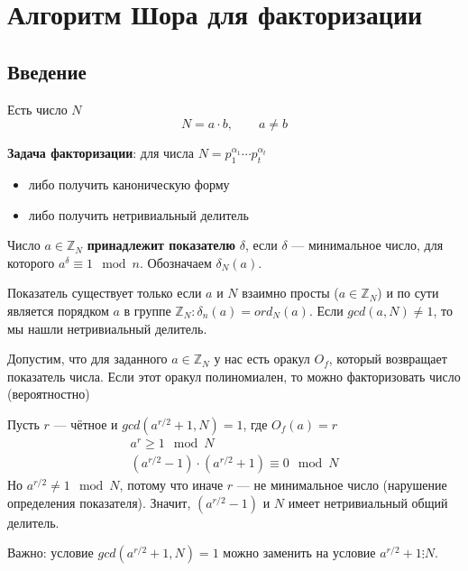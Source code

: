 \def\ZN{\mathbb{Z}_{N}}
\chapter{Алгоритм Шора для факторизации}
\section{Введение}

Есть число $N$
\begin{equation*}
  N = a \cdot b,\qquad a \neq b
\end{equation*}

\textbf{Задача факторизации}: для числа
$N = p_{1}^{\alpha_{1}} \cdots p_{t}^{\alpha_{t}}$
\begin{itemize}
  \item либо получить каноническую форму
  \item либо получить нетривиальный делитель
\end{itemize}

Число $a \in \mathbb{Z}_{N}$ \textbf{принадлежит показателю} $\delta$, если
$\delta$ --- минимальное число, для которого
$a^{\delta} \equiv 1 \mod n$.
Обозначаем $\delta_{N}\left( a \right)$.

Показатель существует только если $a$ и $N$ взаимно просты ($a \in \ZN$)
и по сути является порядком $a$ в группе
$\ZN: \delta_{n}\left( a \right) = ord_{N}\left( a \right)$.
Если $gcd\left( a, N \right) \neq 1$, то мы нашли нетривиальный делитель.

Допустим, что для заданного $a \in \ZN$ у нас есть оракул $O_{f}$,
который возвращает показатель числа.
Если этот оракул полиномиален, то можно факторизовать число (вероятностно)

Пусть $r$ --- чётное и $gcd\left( a^{r/2} + 1, N \right) = 1$,
где $O_{f}\left( a \right) = r$
\begin{equation*}
  \begin{split}
    a^{r} \ge 1 \mod N \\
    \left( a^{r/2} - 1 \right) \cdot \left( a^{r/2} + 1 \right) \equiv
      0 \mod N
  \end{split}
\end{equation*}
Но $a^{r/2} \neq 1 \mod N$, потому что иначе $r$ --- не минимальное число
(нарушение определения показателя).
Значит, $\left( a^{r/2} - 1 \right)$ и $N$ имеет нетривиальный общий делитель.

Важно: условие $gcd\left( a^{r/2} + 1, N \right) = 1$ можно заменить на
условие $a^{r/2} + 1 \vdots N$.

